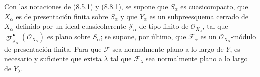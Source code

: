 \begin{proposition}[11.3.6]
\label{IV.11.3.6}
Con las notaciones de (8.5.1) y (8.8.1), se supone que $S_\alpha$ es cuasicompacto, que $X_\alpha$ es de presentación finita sobre $S_\alpha$ y que $Y_\alpha$ es un subpreesquema cerrado de $X_\alpha$ definido por un ideal cuasicoherente $\mathcal J_\alpha$ de tipo finito de $\mathcal O_{X_\alpha}$, tal que $\operatorname{gr}_{\mathcal J_\alpha}^\bullet(\mathcal O_{X_\alpha})$ es plano sobre $S_\alpha$; se supone, por último, que $\mathcal F_\alpha$ es un $\mathcal O_{X_\alpha}$-módulo de presentación finita. Para que $\mathcal F$ sea normalmente plano a lo largo de $Y$, es necesario y suficiente que exista $\lambda$ tal que $\mathcal F_\lambda$ sea normalmente plano a lo largo de $Y_\lambda$.
\end{proposition}

